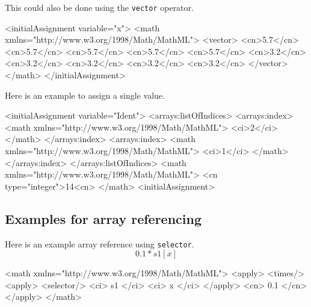 This could also be done using the {\tt vector} operator.

\begin{example}
<initialAssignment variable="x"> 
 <math xmlns="http://www.w3.org/1998/Math/MathML">
  <vector> 
   <cn>5.7</cn> 
   <cn>5.7</cn> 
   <cn>5.7</cn> 
   <cn>5.7</cn> 
   <cn>5.7</cn> 
   <cn>3.2</cn> 
   <cn>3.2</cn> 
   <cn>3.2</cn> 
   <cn>3.2</cn> 
   <cn>3.2</cn>
  </vector>
 </math>
</initialAssignment>
\end{example}



Here is an example to assign a single value. 

\begin{example}
<initialAssignment variable="Ident"> 
 <arrays:listOfIndices>
  <arrays:index>
    <math xmlns="http://www.w3.org/1998/Math/MathML">
      <ci>2</ci>
    </math>
  </arrays:index>
  <arrays:index>
    <math xmlns="http://www.w3.org/1998/Math/MathML">
      <ci>1</ci>
    </math>
  </arrays:index>
 </arrays:listOfIndices>
 <math xmlns="http://www.w3.org/1998/Math/MathML">
  <cn type="integer">14<cn>
 </math>
<initialAssignment>
\end{example}

\subsection{Examples for array referencing}

Here is an example array reference using {\tt selector}.
\begin{displaymath}
0.1 * s1[x]
\end{displaymath}
\begin{example}
<math xmlns="http://www.w3.org/1998/Math/MathML">
 <apply>
  <times/>
   <apply>
    <selector/>
     <ci> s1 </ci>
     <ci> x </ci> 
   </apply>
   <cn> 0.1 </cn>
 </apply>
</math>
\end{example}

